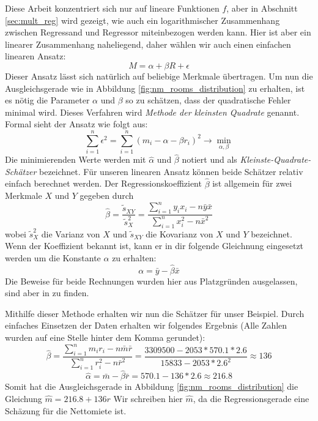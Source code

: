 Diese Arbeit konzentriert sich nur auf lineare Funktionen $f$, aber in Abschnitt \ref{sec:mult_reg} wird gezeigt, wie auch ein logarithmischer Zusammenhang zwischen Regressand und Regressor miteinbezogen werden kann.
Hier ist aber ein linearer Zusammenhang naheliegend, daher wählen wir auch einen einfachen linearen Ansatz:
\begin{equation}
  M = \alpha + \beta R + \epsilon
\end{equation}
Dieser Ansatz lässt sich natürlich auf beliebige Merkmale übertragen.
Um nun die Ausgleichsgerade wie in Abbildung \ref{fig:nm_rooms_distribution} zu erhalten, ist es nötig die Parameter $\alpha$ und $\beta$ so zu schätzen, dass der quadratische Fehler minimal wird.
Dieses Verfahren wird  \textit{Methode der kleinsten Quadrate} genannt.
Formal sieht der Ansatz wie folgt aus:
\begin{equation}
  \sum\limits_{i=1}^{n} \epsilon^2 = \sum\limits_{i=1}^{n} (m_i - \alpha - \beta r_i)^2 \rightarrow \min\limits_{\alpha, \beta}
\end{equation}
Die minimierenden Werte werden mit $\hat\alpha$ und $\hat\beta$ notiert und als \textit{Kleinste-Quadrate-Schätzer} bezeichnet.
Für unseren linearen Ansatz können beide Schätzer relativ einfach berechnet werden.
Der Regressionskoeffizient $\hat\beta$ ist allgemein für zwei Merkmale $X$ und $Y$ gegeben durch
\begin{equation}
  \hat\beta = \frac{\tilde s_{XY}}{\tilde{s}^2_X} = \frac{\sum\limits_{i=1}^{n} y_i x_i - n \bar y \bar x}{\sum\limits_{i=1}^{n} x_i^2 - n \bar{x}^2}
\end{equation}
wobei $\tilde{s}^2_X$ die Varianz von $X$ und $\tilde s_{XY}$ die Kovarianz von $X$ und $Y$ bezeichnet. 
Wenn der Koeffizient bekannt ist, kann er in dir folgende Gleichnung eingesetzt werden um die Konstante $\alpha$ zu erhalten:
\begin{equation}
  \alpha = \bar y - \hat\beta \bar x
\end{equation}
Die Beweise für beide Rechnungen wurden hier aus Platzgründen ausgelassen, sind aber in \citet[S. 155]{Fahrmeir2010} zu finden.

Mithilfe dieser Methode erhalten wir nun die Schätzer für unser Beispiel.
Durch einfaches Einsetzen der Daten erhalten wir folgendes Ergebnis (Alle Zahlen wurden auf eine Stelle hinter dem Komma gerundet):
\begin{equation}
  \hat\beta = \frac{\sum\limits_{i=1}^{n} m_i r_i - n \bar m \bar r}{\sum\limits_{i=1}^{n} r_i^2 - n \bar{r}^2}
  = \frac{3309500 - 2053 * 570.1 * 2.6}{15833 - 2053 * 2.6^2}
  \approx 136
\end{equation}
\begin{equation}
  \hat\alpha = \bar m - \hat\beta \bar r 
  = 570.1 - 136 * 2.6 
  \approx 216.8
\end{equation}
Somit hat die Ausgleichsgerade in Abbildung \ref{fig:nm_rooms_distribution} die Gleichung $\hat m = 216.8 + 136 r$
Wir schreiben hier $\hat m$, da die Regressionsgerade eine Schäzung für die Nettomiete ist.

